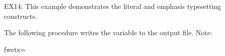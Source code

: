 \def\p#1{{\tt #1}}  %
\def\flagpage#1#2{
   \null
   \vfill
   \centerline{\fwfontboldd #1}
   \vskip 1cm
   \centerline{\fwfontboldd #2}
   \vfill
   \null
   \vfill
}

EX14: This example demonstrates the literal and emphasis typesetting constructs.

The following procedure  writes the  variable to
the output file. Note: 

\fwbeginmacro
{}\fwequals \fwodef \fwbtx[dummy
]fwetx=%
\fwcdef 
\fwbeginmacronotes
{}
\fwendmacronotes
\fwendmacro

\bye



